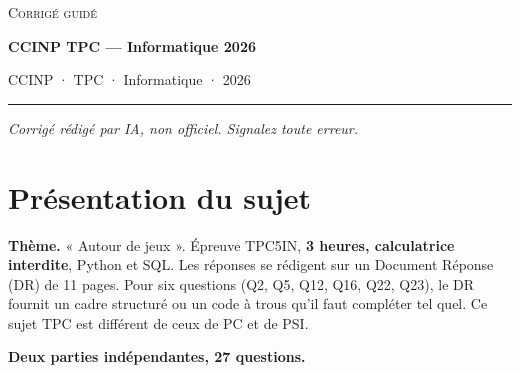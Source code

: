 \documentclass[11pt,a4paper]{article}
\begin{document}
\thispagestyle{plain}
\begin{center}
  {\small\scshape Corrigé guidé}\par\smallskip
  {\LARGE\bfseries CCINP TPC — Informatique 2026\par}\medskip
  {\large CCINP · TPC · Informatique · 2026\par}
\end{center}
\vspace{2pt}\hrule\vspace{8pt}

\emph{Corrigé rédigé par IA, non officiel. Signalez toute erreur.}

\hypertarget{pruxe9sentation-du-sujet}{%
\section{Présentation du sujet}\label{pruxe9sentation-du-sujet}}

\textbf{Thème.} « Autour de jeux ». Épreuve TPC5IN, \textbf{3 heures, calculatrice interdite}, Python et SQL. Les réponses se rédigent sur un Document Réponse (DR) de 11 pages. Pour six questions (Q2, Q5, Q12, Q16, Q22, Q23), le DR fournit un cadre structuré ou un code à trous qu'il faut compléter tel quel. Ce sujet TPC est différent de ceux de PC et de PSI.

\textbf{Deux parties indépendantes, 27 questions.}
\end{document}
